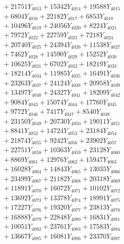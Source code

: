 \documentclass[a4paper,10pt]{article}
\begin{document}
{\begin{align}
&\;  + 21751 Y_{4013} + 15342 Y_{4014} + 19588 Y_{4015} \\[0.3ex]
&\;  + 6804 Y_{4016} + 22182 Y_{4017} + 6853 Y_{4018} \\[0.5ex]\allowbreak
&\;  + 10496 Y_{4019} + 24056 Y_{4020} + 8224 Y_{4021} \\[0.3ex]
&\;  + 7972 Y_{4022} + 22759 Y_{4023} + 7218 Y_{4024} \\[0.3ex]
&\;  + 20740 Y_{4025} + 24394 Y_{4026} + 11538 Y_{4027} \\[0.3ex]
&\;  + 7462 Y_{4028} + 14590 Y_{4029} + 15252 Y_{4030} \\[0.3ex]
&\;  + 10625 Y_{4031} + 6702 Y_{4032} + 18219 Y_{4033} \\[0.3ex]
&\;  + 18214 Y_{4034} + 11985 Y_{4035} + 16491 Y_{4036} \\[0.3ex]
&\;  + 23263 Y_{4037} + 24124 Y_{4038} + 20958 Y_{4039} \\[0.3ex]
&\;  + 13497 Y_{4040} + 24327 Y_{4041} + 18209 Y_{4042} \\[0.3ex]
&\;  + 9084 Y_{4043} + 15074 Y_{4044} + 17760 Y_{4045} \\[0.3ex]
&\;  + 9772 Y_{4046} + 7417 Y_{4047} + 8540 Y_{4048} \\[0.5ex]\allowbreak
&\;  + 23150 Y_{4049} + 20730 Y_{4050} + 19011 Y_{4051} \\[0.3ex]
&\;  + 8841 Y_{4052} + 14724 Y_{4053} + 23184 Y_{4054} \\[0.3ex]
&\;  + 21874 Y_{4055} + 9242 Y_{4056} + 23902 Y_{4057} \\[0.3ex]
&\;  + 22751 Y_{4058} + 10363 Y_{4059} + 23128 Y_{4060} \\[0.3ex]
&\;  + 8869 Y_{4061} + 12976 Y_{4062} + 15947 Y_{4063} \\[0.3ex]
&\;  + 16028 Y_{4064} + 14843 Y_{4065} + 13035 Y_{4066} \\[0.3ex]
&\;  + 23499 Y_{4067} + 21182 Y_{4068} + 20318 Y_{4069} \\[0.3ex]
&\;  + 11891 Y_{4070} + 16072 Y_{4071} + 10102 Y_{4072} \\[0.3ex]
&\;  + 13692 Y_{4073} + 13378 Y_{4074} + 18991 Y_{4075} \\[0.3ex]
&\;  + 17227 Y_{4076} + 19320 Y_{4077} + 23813 Y_{4078} \\[0.5ex]\allowbreak
&\;  + 16888 Y_{4079} + 22848 Y_{4080} + 16831 Y_{4081} \\[0.3ex]
&\;  + 10051 Y_{4082} + 23761 Y_{4083} + 17583 Y_{4084} \\[0.3ex]
&\;  + 13667 Y_{4085} + 16081 Y_{4086} + 23370 Y_{4087} \\[0.3ex]

\end{align}}
\end{document}
